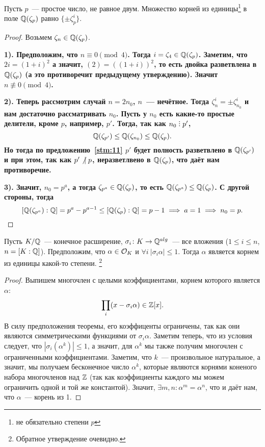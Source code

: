 	\begin{lemma}\label{lemma:13} 
		Пусть $p$~--- простое число, не равное двум. Множество корней из единицы\footnote{не обязательно степени $p$} в поле $\mathbb{Q}(\zeta_{p})$ равно $\{ \pm \zeta_{p}^{i} \}.$
	\end{lemma}
	\begin{proof}
		Возьмем $\zeta_n \in \mathbb{Q}(\zeta_{p})$. 

		\bf{1)}. Предположим, что $n \equiv 0 \pmod{4}$. Тогда $i = \zeta_{4} \in \mathbb{Q}(\zeta_{p})$. Заметим, что $2i = (1 + i)^2$ а значит, $(2) = ((1 + i))^2$, то есть двойка разветвлена в $\mathbb{Q}(\zeta_{p})$ (а это противоречит предыдущему утверждению). Значит $n \not\equiv 0 \pmod{4}$. 

		\bf{2)}. Теперь рассмотрим случай  $n = 2n_{0}$, $n$~--- нечётное. Тогда $\zeta^{i}_{n} = \pm \zeta_{n_0}^{i}$ и нам достаточно рассматривать $n_0$. Пусть у $n_0$ есть какие-то простые делители, кроме $p$, например, $p'$. Тогда, так как $n_0 \divby p'$, 
		\[
			\mathbb{Q}(\zeta_{p'}) \le \mathbb{Q}(\zeta_{n_0}) \le \mathbb{Q}(\zeta_{p}).
		\]
		Но тогда по предложению~\ref{stm:11} $p'$ будет полность разветвлено в $\mathbb{Q}(\zeta_{p'})$ и при этом, так как $p' \not \ \mid p$, неразветлвено в $\mathbb{Q}(\zeta_{p})$, что даёт нам противоречие. 
		
		\bf{3)}. Значит, $n_0 = p^a$, а тогда $\zeta_{p^{a}} \in \mathbb{Q}(\zeta_{p})$, то есть $\mathbb{Q}(\zeta_{p^{a}}) \le \mathbb{Q}(\zeta_{p})$. С другой стороны, тогда 
		\[
			[\mathbb{Q}(\zeta_{p^{a}}) : \mathbb{Q}] = p^{a} - p^{a - 1} \le [\mathbb{Q}(\zeta_{p}) : \mathbb{Q}] = p - 1 \implies a = 1 \implies n_0 = p.
		\]
	\end{proof}

	\begin{lemma}\label{lemma:14}
		Пусть $K/\mathbb{Q}$~--- конечное расширение, $\sigma_i \colon K \to \mathbb{Q}^{alg}$~--- все вложения ($1 \le i \le n$, $n = [K : \mathbb{Q}]$). Предположим, что $\alpha \in \mathcal{O}_{K}$ и $\forall i \ |\sigma_{i}\alpha| \le 1$. Тогда $\alpha$ является корнем из единицы какой-то степени. \footnote{Обратное утверждение очевидно.}
 	\end{lemma}
 	\begin{proof}
 		Выпишем многочлен с целыми коэффициентами, корнем которого является $\alpha$:
 		\[
 			\prod_{i} (x - \sigma_{i} \alpha) \in \mathbb{Z}[x].
 		\]
 		В силу предположения теоремы, его коэффиценты ограничены, так как они являются симметрическими функциями от $\sigma_{i}\alpha$. Заметим теперь, что из условия следует, что $|\sigma_{i}(\alpha^k)| \le 1$, а значит, для $\alpha^k$ мы также получим многочлен с ограниченными коэффициентами. Заметим, что $k$~--- произвольное натуральное, а значит, мы получаем бесконечное число $\alpha^k$, которые являются корнями коненого набора многочленов над $\mathbb{Z}$ (так как коэффициенты  каждого мы можем ограничить одной и той же константой).  Значит, $\exists m, n \colon \alpha^m = \alpha^n$, что и даёт нам, что $\alpha$~--- корень из 1. 
 	\end{proof}

